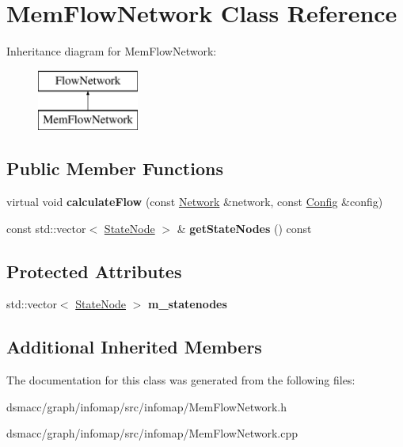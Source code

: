 \hypertarget{classMemFlowNetwork}{}\section{Mem\+Flow\+Network Class Reference}
\label{classMemFlowNetwork}
Inheritance diagram for Mem\+Flow\+Network\+:\begin{figure}[H]
\begin{center}
\leavevmode
\includegraphics[height=2.000000cm]{classMemFlowNetwork}
\end{center}
\end{figure}
\subsection*{Public Member Functions}
\begin{DoxyCompactItemize}
\item 
\mbox{\label{classMemFlowNetwork_a412fc3dd822144e0d98c7945ad57a9b8}} 
virtual void {\bfseries calculate\+Flow} (const \mbox{\hyperlink{classNetwork}{Network}} \&network, const \mbox{\hyperlink{structConfig}{Config}} \&config)
\item 
\mbox{\label{classMemFlowNetwork_aabf0a769d29ae8ffede2a7c805b3859c}} 
const std\+::vector$<$ \mbox{\hyperlink{structStateNode}{State\+Node}} $>$ \& {\bfseries get\+State\+Nodes} () const
\end{DoxyCompactItemize}
\subsection*{Protected Attributes}
\begin{DoxyCompactItemize}
\item 
\mbox{\label{classMemFlowNetwork_a8452acaef79d2f71d11c9b315f843b55}} 
std\+::vector$<$ \mbox{\hyperlink{structStateNode}{State\+Node}} $>$ {\bfseries m\+\_\+statenodes}
\end{DoxyCompactItemize}
\subsection*{Additional Inherited Members}


The documentation for this class was generated from the following files\+:\begin{DoxyCompactItemize}
\item 
dsmacc/graph/infomap/src/infomap/Mem\+Flow\+Network.\+h\item 
dsmacc/graph/infomap/src/infomap/Mem\+Flow\+Network.\+cpp\end{DoxyCompactItemize}
